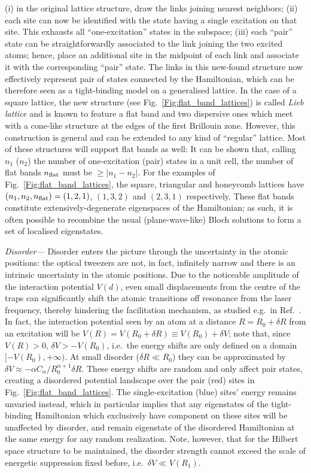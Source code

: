 \documentclass[prl,aps,twocolumn,showpacs,superscriptaddress,longbibliography]{revtex4-1}
\newcommand{\abs}[1]{\left| #1 \right|}
\begin{document}
(i) in the original lattice structure, draw the links joining nearest neighbors; (ii) each site can now be identified with the state having a single excitation on that site. This exhausts all ``one-excitation'' states in the subspace; (iii) each ``pair'' state can be straightforwardly associated to the link joining the two excited atoms; hence, place an additional site in the midpoint of each link and associate it with the corresponding ``pair'' state. The links in this new-found structure now effectively represent pair of states connected by the Hamiltonian, which can be therefore seen as a tight-binding model on a generalised lattice. In the case of a square lattice, the new structure (see Fig.~\ref{Fig:flat_band_lattices}) is called \emph{Lieb lattice} and is known to feature a flat band and two dispersive ones which meet with a cone-like structure at the edges of the first Brillouin zone. However, this construction is general and can be extended to any kind of ``regular'' lattice. Most of these structures will support flat bands as well: It can be shown \cite{SM} that, calling $n_1$ ($n_2$) the number of one-excitation (pair) states in a unit cell, the number of flat bands $n_{\rm flat}$ must be $\geq \abs{n_1 - n_2}$. For the examples of Fig.~\ref{Fig:flat_band_lattices}, {\color{red} the square, triangular and honeycomb lattices have $(n_1,n_2,n_{\rm flat}) = (1,2,1)$, $(1,3,2)$ and $(2,3,1)$ respectively.} These flat bands constitute extensively-degenerate eigenspaces of the Hamiltonian; as such, it is often possible to recombine the usual (plane-wave-like) Bloch solutions to form a set of localised eigenstates. 

\emph{Disorder---} Disorder enters the picture through the uncertainty in the atomic positions: the optical tweezers are not, in fact, infinitely narrow and there is an intrinsic uncertainty in the atomic positions. Due to the noticeable amplitude of the interaction potential $V(d)$, even small displacements from the centre of the traps can significantly shift the atomic transitions off resonance from the laser frequency, thereby hindering the facilitation mechanism, as studied e.g.~in Ref.~\cite{a_Marcuzzi_PRL_17}. In fact, the interaction potential seen by an atom at a distance $R = R_0 + \delta R$ from an excitation will be $V(R) = V(R_0 + \delta R) \equiv V(R_0) + \delta V$; note that, since $V(R) >0$, $\delta V > - V(R_0)$, i.e.~the energy shifts are only defined on a domain $[-V(R_0), +\infty)$. At small disorder ($\delta R \ll R_0$) they can be approximated by $\delta V \approx -\alpha C_\alpha / R_0^{\alpha + 1} \delta R$. These energy shifts are random and only affect pair states, creating a disordered potential landscape over the pair (red) sites in Fig.~\ref{Fig:flat_band_lattices}. The single-excitation (blue) sites' energy remains unvaried instead, which in particular implies that any eigenstates of the tight-binding Hamiltonian which exclusively have component on these sites will be unaffected by disorder, and remain eigenstate of the disordered Hamiltonian at the same energy for any random realization. Note, however, that for the Hilbert space structure to be maintained, the disorder strength cannot exceed the scale of energetic suppression fixed before, i.e.~$\delta V \ll V(R_1)$. 
\end{document}
